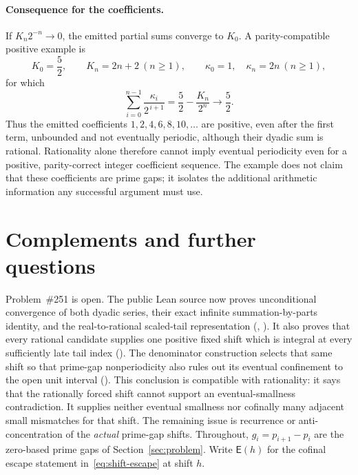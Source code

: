 \documentclass[11pt]{article}
\begin{document}
\paragraph{Consequence for the coefficients.}
If $K_n2^{-n}\to0$, the emitted partial sums converge to $K_0$.  A
parity-compatible positive example is
\[
 K_0=\frac52,\qquad K_n=2n+2\ (n\ge1),\qquad
 \kappa_0=1,\quad\kappa_n=2n\ (n\ge1),
\]
for which
\[
 \sum_{i=0}^{n-1}\frac{\kappa_i}{2^{\,i+1}}
   =\frac52-\frac{K_n}{2^n}\longrightarrow\frac52.
\]
Thus the emitted coefficients $1,2,4,6,8,10,\ldots$ are positive, even after
the first term, unbounded and not eventually periodic, although their dyadic
sum is rational.  Rationality alone therefore cannot imply eventual
periodicity even for a positive, parity-correct integer coefficient sequence.
The example does not claim that these coefficients are prime gaps; it isolates
the additional arithmetic information any successful argument must use.

\section{Complements and further questions}\label{sec:open}

Problem~\#251 is open.  The public Lean source now proves unconditional
convergence of both dyadic series, their exact infinite summation-by-parts
identity, and the real-to-rational scaled-tail representation
(,
).
It also proves that every rational candidate supplies one positive fixed shift
which is integral at every sufficiently late tail index
().
The denominator construction selects that same shift so that prime-gap
nonperiodicity also rules out its eventual confinement to the open unit
interval
().
This conclusion is compatible with rationality: it says that the rationally
forced shift cannot support an eventual-smallness contradiction.  It supplies
neither eventual smallness nor cofinally many adjacent small mismatches for
that shift.
The remaining issue is recurrence or anti-concentration of the \emph{actual}
prime-gap shifts.  Throughout, $g_i=p_{i+1}-p_i$ are the zero-based prime gaps
of Section~\ref{sec:problem}.  Write $\mathsf E(h)$ for the cofinal escape
statement in~\eqref{eq:shift-escape} at shift $h$.
\end{document}
